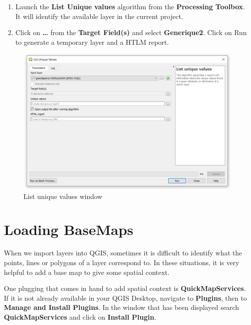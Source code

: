 \documentclass[]{book}
\theoremstyle{definition}
\theoremstyle{definition}
\theoremstyle{definition}
\theoremstyle{remark}
\begin{document}
\begin{enumerate}
\def\labelenumi{\arabic{enumi}.}
\item
  Launch the \textbf{List Unique values} algorithm from the
  \textbf{Processing Toolbox}. It will identify the available layer in
  the current project.
\item
  Click on \textbf{\ldots{}} from the \textbf{Target Field(s)} and
  select \textbf{Generique2}. Click on Run to generate a temporary layer
  and a HTLM report.
\end{enumerate}

\begin{figure}

{\centering \includegraphics[width=14.79in]{figures/List_Unique_Values} 

}

\caption{List unique values window}\label{fig:unnamed-chunk-21}
\end{figure}

\section{Loading BaseMaps}\label{basemaps}

When we import layers into QGIS, sometimes it is difficult to identify
what the points, lines or polygons of a layer correspond to. In these
situations, it is very helpful to add a base map to give some spatial
context.

One plugging that comes in hand to add spatial context is
\textbf{QuickMapServices}. If it is not already available in your QGIS
Desktop, navigate to \textbf{Plugins}, then to \textbf{Manage and
Install Plugins}. In the window that has been displayed search
\textbf{QuickMapServices} and click on \textbf{Install Plugin}.
\end{document}
